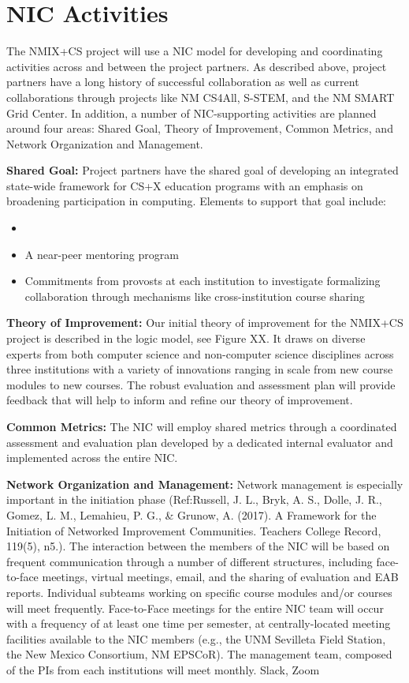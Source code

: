 \section{NIC Activities}
The NMIX+CS project will use a NIC model for developing and coordinating activities across and between the project partners. As described above, project partners have a long history of successful collaboration as well as current collaborations through projects like NM CS4All, S-STEM, and the NM SMART Grid Center. In addition, a number of NIC-supporting activities are planned around four areas: Shared Goal, Theory of Improvement, Common Metrics, and Network Organization and Management.

\textbf{Shared Goal:} Project partners have the shared goal of developing an integrated state-wide framework for CS+X education programs with an emphasis on broadening participation in computing. Elements to support that goal include:
\begin{itemize}
        \item 
        \item A near-peer mentoring program 
        \item Commitments from provosts at each institution to investigate formalizing collaboration through mechanisms like cross-institution course sharing
\end{itemize}
\textbf{Theory of Improvement:} Our initial theory of improvement for the NMIX+CS project is described in the logic model, see Figure XX. It draws on diverse experts from both computer science and non-computer science disciplines across three institutions with a variety of innovations ranging in scale from new course modules to new courses. The robust evaluation and assessment plan will provide feedback that will help to inform and refine our theory of improvement.

\textbf{Common Metrics:} The NIC will employ shared metrics through a coordinated assessment and evaluation plan developed by a dedicated internal evaluator and implemented across the entire NIC.

\textbf{Network Organization and Management:} Network management is especially important in the initiation phase (Ref:Russell, J. L., Bryk, A. S., Dolle, J. R., Gomez, L. M., Lemahieu, P. G., \& Grunow, A. (2017). A Framework for the Initiation of Networked Improvement Communities. Teachers College Record, 119(5), n5.). The interaction between the members of the NIC will be based on frequent communication through a number of different structures, including face-to-face meetings, virtual meetings, email, and the sharing of evaluation and EAB reports. Individual subteams working on specific course modules and/or courses will meet frequently. Face-to-Face meetings for the entire NIC team will occur with a frequency of at least one time per semester, at centrally-located meeting facilities available to the NIC members (e.g., the UNM Sevilleta Field Station, the New Mexico Consortium, NM EPSCoR). The management team, composed of the PIs from each institutions will meet monthly. Slack, Zoom 
